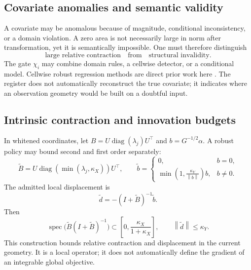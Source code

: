 \documentclass[10pt,a4paper]{article}
\newcommand{\diag}{\operatorname{diag}}
\newcommand{\spec}{\operatorname{spec}}
\newcommand{\norm}[1]{\left\lVert #1\right\rVert}
\begin{document}
\subsection{Covariate anomalies and semantic validity}
A covariate may be anomalous because of magnitude, conditional inconsistency, or a domain violation. A zero area is not necessarily large in norm after transformation, yet it is semantically impossible. One must therefore distinguish
\[
\text{large relative contraction}
\quad\text{from}\quad
\text{structural invalidity}.
\]
The gate $\chi_i$ may combine domain rules, a cellwise detector, or a conditional model. Cellwise robust regression methods are direct prior work here \citep{filzmoser2020}. The register does not automatically reconstruct the true covariate; it indicates where an observation geometry would be built on a doubtful input.

\subsection{Intrinsic contraction and innovation budgets}
In whitened coordinates, let $B=U\diag(\lambda_j)U^\top$ and $b=G^{-1/2}\alpha$. A robust policy may bound second and first order separately:
\begin{equation}
\widetilde B
=U\diag(\min(\lambda_j,\kappa_X))U^\top,
\qquad
\widetilde b
=
\begin{cases}
0,& b=0,\\[1mm]
\displaystyle \min\left(1,\frac{\kappa_Y}{\norm b}\right)b,& b\neq0.
\end{cases}
\label{eq:intrinsic-clipping}
\end{equation}
The admitted local displacement is
\begin{equation}
\widetilde d=-(I+\widetilde B)^{-1}\widetilde b.
\end{equation}
Then
\[
\spec\bigl(\widetilde B(I+\widetilde B)^{-1}\bigr)
\subset\left[0,\frac{\kappa_X}{1+\kappa_X}\right],
\qquad
\norm{\widetilde d}\leq\kappa_Y.
\]
This construction bounds relative contraction and displacement in the current geometry. It is a local operator; it does not automatically define the gradient of an integrable global objective.
\end{document}

